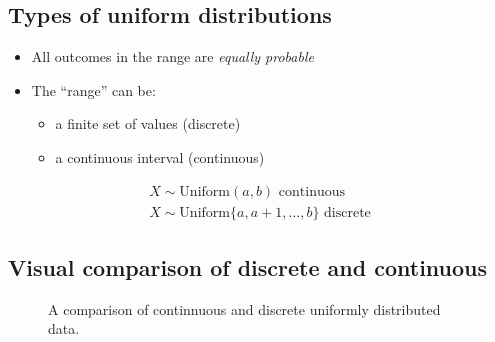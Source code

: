 \documentclass[
  a4paper,
]{scrbook}
\providecommand{\tightlist}{%
  \setlength{\itemsep}{0pt}\setlength{\parskip}{0pt}}\usepackage{longtable,booktabs,array}
\begin{document}
\subsection{Types of uniform
distributions}\label{types-of-uniform-distributions}

\begin{itemize}
\tightlist
\item
  All outcomes in the range are \emph{equally probable}
\item
  The ``range'' can be:

  \begin{itemize}
  \tightlist
  \item
    a finite set of values (discrete)
  \item
    a continuous interval (continuous)
  \end{itemize}
\end{itemize}

\begin{align}
X \sim \mathrm{Uniform}(a,b) \text{ continuous}\\
X \sim \mathrm{Uniform}\{a,a+1,\ldots,b\} \text{ discrete}
\end{align}

\subsection{Visual comparison of discrete and
continuous}\label{visual-comparison-of-discrete-and-continuous}

\begin{figure}[ht]


\caption{\label{fig-unif-pmf-pdf}A comparison of continnuous and
discrete uniformly distributed data.}

\end{figure}%
\end{document}
